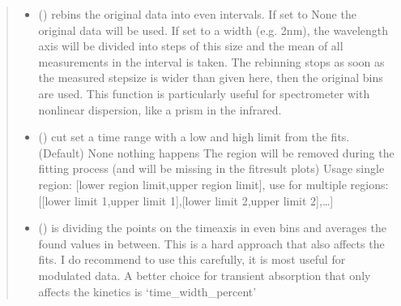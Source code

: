 \documentclass[letterpaper,10pt,english]{sphinxmanual}
\begin{document}
\begin{fulllineitems}
\begin{quote}
\begin{description}
\begin{itemize}
\item {} 
 (\sphinxstyleliteralemphasis{\sphinxupquote{, }}) \textendash{} rebins the original data into even intervals. If set to None the original data will be used.
If set to a width (e.g. 2nm), the wavelength axis will be divided into steps of this size
and the mean of all measurements in the interval is taken. The re\sphinxhyphen{}binning stops as soon as
the measured stepsize is wider than given here, then the original bins are used.
This function is particularly useful for spectrometer with non\sphinxhyphen{}linear dispersion,
like a prism in the infrared.

\item {} 
 (\sphinxstyleliteralemphasis{\sphinxupquote{ (}}\sphinxstyleliteralemphasis{\sphinxupquote{)}}\sphinxstyleliteralemphasis{\sphinxupquote{, }}) \textendash{} cut set a time range with a low and high limit from the fits. (Default) None nothing happens
The region will be removed during the fitting process (and will be missing in the fit\sphinxhyphen{}result
plots)
Usage single region: {[}lower region limit,upper region limit{]},
use for multiple regions:{[}{[}lower limit 1,upper limit 1{]},{[}lower limit 2,upper limit 2{]},…{]}

\item {} 
 (\sphinxstyleliteralemphasis{\sphinxupquote{, }}) \textendash{} is dividing the points on the time\sphinxhyphen{}axis in even bins and averages the found values in between.
This is a hard approach that also affects the fits. I do recommend to use this carefully,
it is most useful for modulated data. A better choice for transient absorption that only
affects the kinetics is ‘time\_width\_percent’


\end{itemize}
\end{description}
\end{quote}
\end{fulllineitems}
\end{document}
